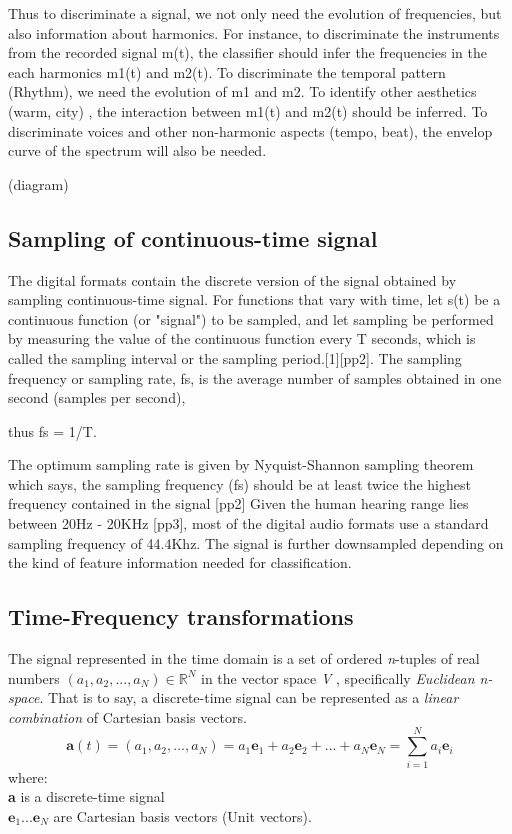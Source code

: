 Thus to discriminate a signal, we not only need the evolution of frequencies, but also information about harmonics. For instance, to discriminate the instruments from the recorded signal m(t), the classifier should infer the frequencies in the each harmonics m1(t) and m2(t). To discriminate the temporal pattern (Rhythm), we need the evolution of m1 and m2. To identify other aesthetics (warm, city) , the interaction between m1(t) and m2(t) should be inferred. To discriminate voices and other non-harmonic aspects (tempo, beat), the envelop curve of the spectrum will also be needed.    

(diagram)


\subsection{Sampling of continuous-time signal}
The digital formats contain the discrete version of the signal obtained by sampling continuous-time signal. For functions that vary with time, let s(t) be a continuous function (or "signal") to be sampled, and let sampling be performed by measuring the value of the continuous function every T seconds, which is called the sampling interval or the sampling period.[1][pp2]. The sampling frequency or sampling rate, fs, is the average number of samples obtained in one second (samples per second),  

thus fs = 1/T.

The optimum sampling rate is given by Nyquist-Shannon sampling theorem which says, the sampling frequency (fs) should be at least twice the highest frequency contained in the signal [pp2] Given the human hearing range lies between 20Hz - 20KHz [pp3], most of the digital audio formats use a standard sampling frequency of 44.4Khz. The signal is further downsampled depending on the kind of feature information needed for classification. 


\subsection{Time-Frequency transformations}
The signal represented in the time domain is a set of ordered \textit{n}-tuples of real numbers \( (a_{1},a_{2}, ...,a_{N}) \in \mathbb{R}^N \) in the vector space \textit{V} , specifically \textit{Euclidean n-space}. That is to say, a discrete-time signal can be represented as a \textit{linear combination} of Cartesian basis vectors. 
\begin{equation}
\textbf{a}(t) = (a_{1},a_{2}, ...,a_{N}) = a_{1}\textbf{e}_{1} + a_{2}\textbf{e}_{2} + ... + a_{N}\textbf{e}_{N} = \displaystyle\sum_{i=1}^{N}a_{i}\textbf{e}_{i}
\end{equation} 
where:\\
\indent \textbf{a} is a discrete-time signal\\
\indent $\textbf{e}_{1} ... \textbf{e}_{N}$ are Cartesian basis vectors (Unit vectors).
\bigskip

